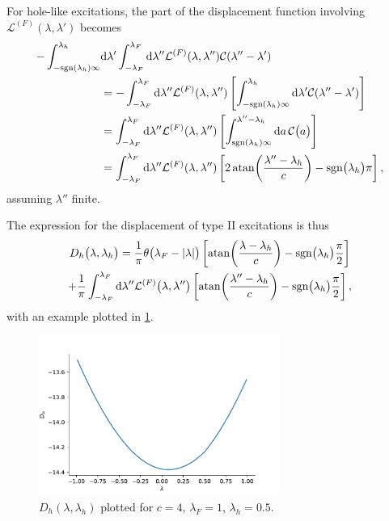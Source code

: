 \documentclass[11pt, a4paper]{report} %
\begin{document}
For hole-like excitations, the part of the displacement function involving \(\mathcal{L}^{(F)}(\lambda,\lambda')\) becomes
\begin{align}
	 - \int_{-\textrm{sgn}(\lambda_h)\infty}^{\lambda_h} &\dd \lambda' \int_{-\lambda_F}^{\lambda_F} \dd \lambda''  \mathcal{L}^{(F)}\qty(\lambda,\lambda'') \mathcal{C}\qty(\lambda''-\lambda')\\
	 &= - \int_{-\lambda_F}^{\lambda_F} \dd \lambda''  \mathcal{L}^{(F)}\qty(\lambda,\lambda'')\left[ \int_{-\textrm{sgn}(\lambda_h)\infty}^{\lambda_h} \dd \lambda' \mathcal{C}\qty(\lambda''-\lambda')\right]\\
	 &= \int_{-\lambda_F}^{\lambda_F} \dd \lambda''  \mathcal{L}^{(F)}\qty(\lambda,\lambda'')\left[ \int_{\textrm{sgn}(\lambda_h)\infty}^{\lambda''-\lambda_h} \dd a \, \mathcal{C}\qty\big(a)\right]\\
	 &= \int_{-\lambda_F}^{\lambda_F} \dd  \lambda''  \mathcal{L}^{(F)}\qty(\lambda,\lambda'')\left[2 \atan(\frac{\lambda''-\lambda_h}{c}) - \textrm{sgn}\qty\big(\lambda_h)\pi\right],
\end{align}
assuming \(\lambda''\) finite.

The expression for the displacement of type II excitations is thus
\begin{multline}
	D_h\qty\big(\lambda, \lambda_h) = \frac{1}{\pi}\theta\qty\big(\lambda_F - \abs{\lambda}) \left[ \atan(\frac{\lambda-\lambda_h}{c}) - \textrm{sgn}\qty\big(\lambda_h)\frac{\pi}{2}\right] \\+
	\frac{1}{\pi}\int_{-\lambda_F}^{\lambda_F} \dd  \lambda''  \mathcal{L}^{(F)}\qty\big(\lambda,\lambda'')\left[ \atan(\frac{\lambda''-\lambda_h}{c}) - \textrm{sgn}\qty\big(\lambda_h)\frac{\pi}{2}\right],
\end{multline}
with an example plotted in \cref{fig:dhplot}.
\begin{figure}[tb!]
  \centering
  \includegraphics[width=0.7\textwidth]{dhplot.pdf}
  \caption{$D_h(\lambda,\lambda_h)$ plotted for \(c=4\), \(\lambda_F=1\), \(\lambda_h=0.5\).}\label{fig:dhplot}
\end{figure}
\end{document}
